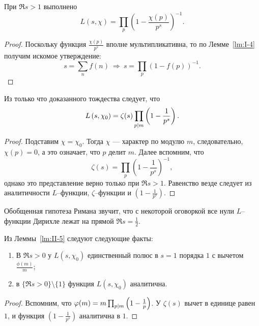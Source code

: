 \begin{nlemma}
\label{lm:II-5}
    При $\Re{s} > 1$ выполнено
    \[
        L(s, \chi) = \prod_{p} \left(1 - \frac{\chi(p)}{p^s} \right)^{-1}.
    \]
\end{nlemma}
\begin{proof}
    Поскольку функция $\frac{\chi(p)}{p^s}$ вполне мультипликативна, то по Лемме~\ref{lm:I-4} получим искомое утверждение:
    \[
        s = \sum_{n} f(n) \ \Rightarrow \ s = \prod_{p} \left(1 - f(p) \right)^{-1}.
    \]
\end{proof}

\begin{ncorollary}
\label{crl:II-2}
    Из только что доказанного тождества следует, что
    \[
        L\left(s, \chi_0\right) = \zeta(s) \prod_{p \mid m} \left( 1 - \frac{1}{p^s} \right).
    \]
\end{ncorollary}
\begin{proof}  
    Подставим $\chi = \chi_0$. Тогда $\chi$ --- характер по модулю $m$, следовательно, $\chi(p) = 0$, а это означает, что $p$ делит $m$. Далее вспомним, что
    \[
        \zeta(s) = \prod_p  \left( 1 - \frac{1}{p^s} \right)^{-1},
    \]
    однако это представление верно только при $\Re{s} > 1$. 
    Равенство везде следует из аналитичности $L$--функции, $\zeta$--функции и $\left( 1 - \frac{1}{p^s} \right)$.
\end{proof}

\begin{remark}
    Обобщенная гипотеза Римана звучит, что с некоторой оговоркой все нули $L$--функции Дирихле лежат на прямой $\Re{s} = \frac{1}{2}$.
\end{remark}

\begin{ncorollary}
\label{crl:II-3}
    Из Леммы~\ref{lm:II-5} следуют следующие факты:
    \begin{enumerate}
        \item
            В $\Re{s} > 0$ у $L\left(s, \chi_0\right)$ единственный полюс в $s = 1$ порядка $1$ с вычетом $\frac{\phi(m)}{m}$;
        \item
            в $\{ \Re{s} > 0 \} \setminus \{ 1 \}$ функция $L\left(s, \chi_0\right)$ аналитична.
    \end{enumerate}
\end{ncorollary}
\begin{proof}
    Вспомним, что $\varphi(m) = m \prod_{p \mid m} \left( 1 - \frac{1}{p} \right)$. У $\zeta(s)$ вычет в единице равен $1$, и функция $\left(1 - \frac{1}{p^s} \right)$ аналитична в $1$.
\end{proof}

